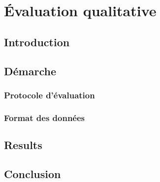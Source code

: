 \chapter{Évaluation qualitative}
\label{chap:main-automatic_evaluation_of_keyphrase_annotation}

  \section{Introduction}
  \label{sec:main-automatic_evaluation_of_keyphrase_annotation-introduction}


  \section{Démarche}
  \label{section:main-automatic_evaluation_of_keyphrase_annotation-methodology}

    \subsection{Protocole d'évaluation}
    \label{subsec:main-automatic_evaluation_of_keyphrase_annotation-methodology-evaluation_protocol}

    \subsection{Format des données}
    \label{subsec:main-automatic_evaluation_of_keyphrase_annotation-methodology-data_format}


  \section{Results}
  \label{sec:main-automatic_evaluation_of_keyphrase_annotation-results}


  \section{Conclusion}
  \label{sec:main-automatic_evaluation_of_keyphrase_annotation-Conclusion}

